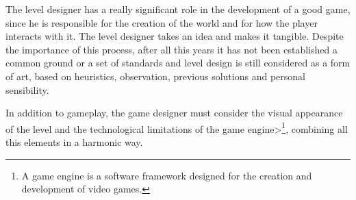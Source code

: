 The level designer has a really significant role in the development of a good game, since he is responsible for the creation of the world and for how the player interacts with it. The level designer takes an idea and makes it tangible. Despite the importance of this process, after all this years it has not been established a common ground or a set of standards and level design is still considered as a form of art, based on heuristics, observation, previous solutions and personal sensibility.

\par

In addition to gameplay, the game designer must consider the visual appearance of the level and the technological limitations of the \<game engine>\footnote{\label{gameEngineFootnote}A game engine is a software framework designed for the creation and development of video games.}, combining all this elements in a harmonic way.

\par

